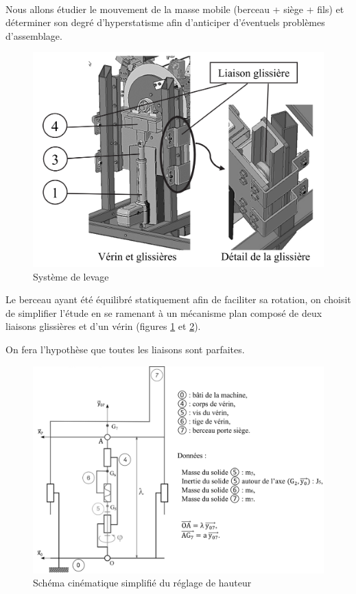 ~\

Nous allons étudier le mouvement de la masse mobile (berceau + siège + fils) et déterminer son degré d'hyperstatisme afin d'anticiper d'éventuels problèmes d'assemblage.

\begin{figure}[!h]
\centering\includegraphics[width=0.6\linewidth]{img/fig19}
 \caption{Système de levage}
 \label{img19}
\end{figure}

Le berceau ayant été équilibré statiquement afin de faciliter sa rotation, on choisit de simplifier l’étude en se ramenant à un mécanisme plan composé de deux liaisons glissières et d’un vérin (figures \ref{img19} et \ref{img20}).

On fera l’hypothèse que toutes les liaisons sont parfaites.

\begin{figure}[!h]
\centering\includegraphics[width=0.8\linewidth]{img/fig20}
 \caption{Schéma cinématique simplifié du réglage de hauteur}
 \label{img20}
\end{figure}


